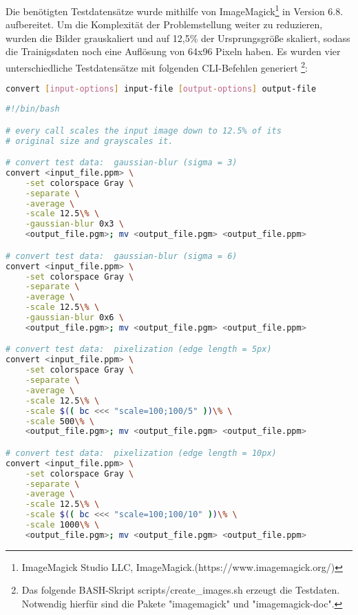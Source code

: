 Die benötigten Testdatensätze wurde mithilfe von ImageMagick\footnote{ImageMagick Studio LLC, ImageMagick.\newline(https://www.imagemagick.org/)} in Version 6.8. aufbereitet. Um die Komplexität der
Problemstellung weiter zu reduzieren, wurden die Bilder grauskaliert und auf 12,5\% der Ursprungsgröße skaliert, sodass
die Trainigsdaten noch eine Auflösung von 64x96 Pixeln haben. Es wurden vier unterschiedliche Testdatensätze mit
folgenden CLI-Befehlen generiert \footnote{Das folgende BASH-Skript scripts/create\_images.sh erzeugt die
Testdaten. Notwendig hierfür sind die Pakete "imagemagick" und "imagemagick-doc".}:


\begin{minipage}{\linewidth}

\begin{lstlisting}[language=bash,caption={convert - Synopsis}]
convert [input-options] input-file [output-options] output-file
\end{lstlisting}

\begin{lstlisting}[language=bash,caption={Testdatenerstellung - Graustufen}]
#!/bin/bash

# every call scales the input image down to 12.5% of its
# original size and grayscales it.

# convert test data:  gaussian-blur (sigma = 3)
convert <input_file.ppm> \
    -set colorspace Gray \
    -separate \
    -average \
    -scale 12.5\% \
    -gaussian-blur 0x3 \
    <output_file.pgm>; mv <output_file.pgm> <output_file.ppm>

# convert test data:  gaussian-blur (sigma = 6)
convert <input_file.ppm> \
    -set colorspace Gray \
    -separate \
    -average \
    -scale 12.5\% \
    -gaussian-blur 0x6 \
    <output_file.pgm>; mv <output_file.pgm> <output_file.ppm>

# convert test data:  pixelization (edge length = 5px)
convert <input_file.ppm> \
    -set colorspace Gray \
    -separate \
    -average \
    -scale 12.5\% \
    -scale $(( bc <<< "scale=100;100/5" ))\% \
    -scale 500\% \
    <output_file.pgm>; mv <output_file.pgm> <output_file.ppm>

# convert test data:  pixelization (edge length = 10px)
convert <input_file.ppm> \
    -set colorspace Gray \
    -separate \
    -average \
    -scale 12.5\% \
    -scale $(( bc <<< "scale=100;100/10" ))\% \
    -scale 1000\% \
    <output_file.pgm>; mv <output_file.pgm> <output_file.ppm>
\end{lstlisting}
\end{minipage}
